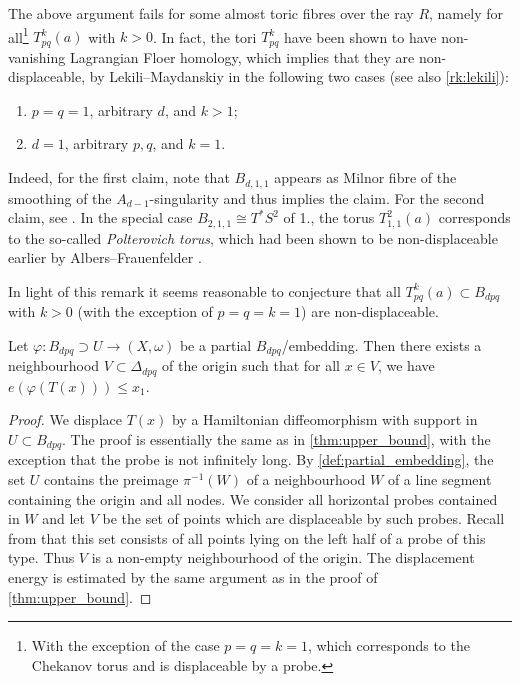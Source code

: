 \documentclass[12pt,a4paper,abstract=true,final]{scrartcl}
\begin{document}
\begin{remark}
    \label{rk:nondisplaceable}
    The above argument fails for some almost toric fibres over the ray $R$, namely for all\footnote{With the exception of the case $p=q=k=1$, which corresponds to the Chekanov torus and is displaceable by a probe.} $T^k_{pq}(a)$ with $k > 0$.
In fact, the tori $T^k_{pq}$ have been shown to have non-vanishing Lagrangian Floer homology, which implies that they are non-displaceable, by Lekili--Maydanskiy \cite{LekMay14} in the following two cases (see also \cref{rk:lekili}):
    \begin{enumerate}
        \item $p = q = 1$, arbitrary $d$, and $k > 1$;
        \item $d = 1$, arbitrary $p,q$, and $k = 1$.
    \end{enumerate}
    Indeed, for the first claim, note that $B_{d,1,1}$ appears as Milnor fibre of the smoothing of the $A_{d-1}$-singularity and thus \cite[Proposition 2.20]{LekMay14} implies the claim.
For the second claim, see \cite[Proposition 3.6]{LekMay14}.
In the special case $B_{2,1,1} \cong T^*S^2$ of 1., the torus $T_{1,1}^2(a)$ corresponds to the so-called \emph{Polterovich torus}, which had been shown to be non-displaceable earlier by Albers--Frauenfelder \cite{AlbFra08}.
\end{remark}

In light of this remark it seems reasonable to conjecture that all $T^k_{pq}(a) \subset B_{dpq}$ with $k > 0$ (with the exception of $p=q=k=1$) are non-displaceable.


\begin{proposition}
\label{thm:upper_bound_embedded}
  Let $φ\colon B_{dpq} ⊃ U → (X,ω)$ be a partial $B_{dpq}$\-/embedding.
Then there exists a neighbourhood $V \subset \Delta_{dpq}$ of the origin such that for all $x \in V$, we have $e(φ(T(x))) \leq x_1$.
\end{proposition}

\begin{proof}
    We displace $T(x)$ by a Hamiltonian diffeomorphism with support in $U \subset B_{dpq}$.
The proof is essentially the same as in \cref{thm:upper_bound}, with the exception that the probe is not infinitely long.
By \cref{def:partial_embedding}, the set $U$ contains the preimage $\pi^{-1}(W)$ of a neighbourhood $W$ of a line segment containing the origin and all nodes.
We consider all horizontal probes contained in $W$ and let $V$ be the set of points which are displaceable by such probes.
Recall from \cite[Section 2.1]{mcduff2011displacing} that this set consists of all points lying on the left half of a probe of this type.
Thus $V$ is a non-empty neighbourhood of the origin.
The displacement energy is estimated by the same argument as in the proof of \cref{thm:upper_bound}.
\end{proof}
\end{document}
